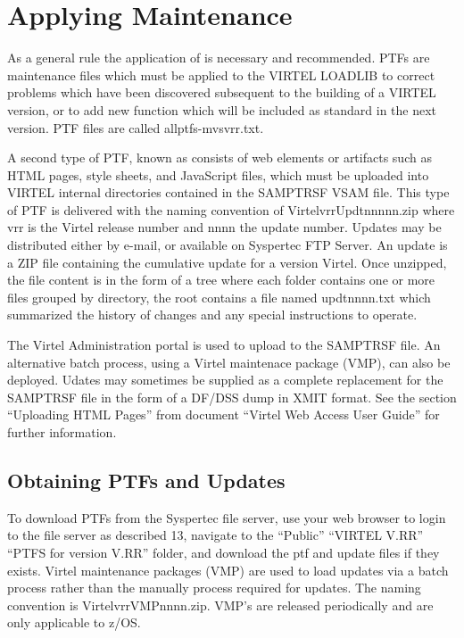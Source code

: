 \documentclass[letterpaper,10pt,english]{sphinxmanual}
\begin{document}
\newpage

\ignorespaces 

\section{Applying Maintenance}
\label{\detokenize{Installation_Guide:applying-maintenance}}\label{\detokenize{Installation_Guide:index-5}}
As a general rule the application of  is necessary and recommended. PTFs are maintenance files which must be applied to the VIRTEL LOADLIB to correct problems which have been discovered subsequent to the building of a VIRTEL version, or to add new function which will be included as standard in the next version. PTF files are called allptfs-mvsvrr.txt.

A second type of PTF, known as  consists of web elements or artifacts such as HTML pages, style sheets, and JavaScript files, which must be uploaded into VIRTEL internal directories contained in the SAMPTRSF VSAM file. This type of PTF is delivered with the naming convention of VirtelvrrUpdtnnnnn.zip where vrr is the Virtel release number and nnnn the update number. Updates may be distributed either by e-mail, or available on Syspertec FTP Server. An update is a ZIP file containing the cumulative update for a version Virtel. Once unzipped, the file content is in the form of a tree where each folder contains one or more files grouped by directory, the root contains a file named updtnnnn.txt which summarized the history of changes and any special instructions to operate.

The Virtel Administration portal is used to upload  to the SAMPTRSF file. An alternative batch process, using a Virtel maintenace package (VMP), can also be deployed. Udates may sometimes be supplied as a complete replacement for the SAMPTRSF file in the form of a DF/DSS dump in XMIT format. See the section “Uploading HTML Pages” from document “Virtel Web Access User Guide” for further information.


\subsection{Obtaining PTFs and Updates}
\label{\detokenize{Installation_Guide:obtaining-ptfs-and-updates}}
To download PTFs from the Syspertec file server, use your web browser to login to the file server as described 13, navigate to the “Public” \textendash{} “VIRTEL V.RR” \textendash{} “PTFS for version V.RR” folder, and download the ptf and update files if they exists. Virtel maintenance packages (VMP) are used to load updates via a batch process rather than the manually process required for updates. The naming convention is VirtelvrrVMPnnnn.zip. VMP’s are released periodically and are only applicable to z/OS.
\end{document}
